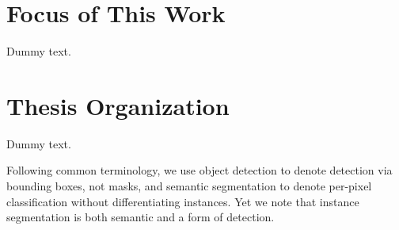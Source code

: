 \section{Focus of This Work}\label{fcswrk}

Dummy text.

\section{Thesis Organization}\label{thsorg}

Dummy text.

Following common terminology, we use object detection to denote detection via bounding boxes, not masks, and semantic segmentation to denote per-pixel classification without differentiating instances. Yet we note that instance segmentation is both semantic and a form of detection.
